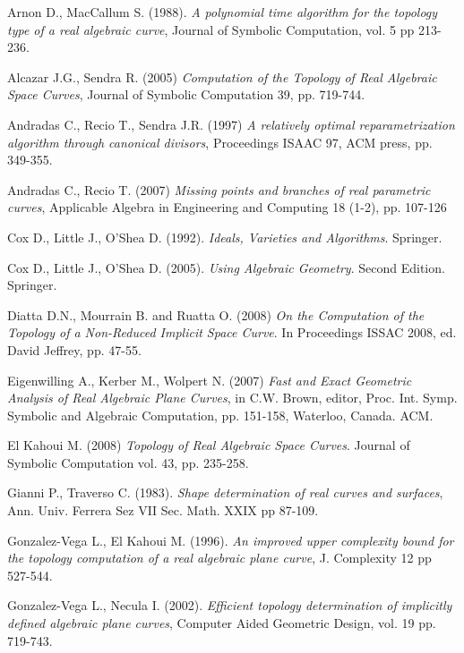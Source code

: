 \documentclass{elsart}
\begin{document}
\begin{thebibliography}{56}

 Arnon
D.,  MacCallum S. (1988). {\it A polynomial time algorithm for the
topology type of a real algebraic curve}, Journal of Symbolic
Computation, vol. 5 pp 213-236.

 Alcazar J.G., Sendra R. (2005) {\it Computation of
the Topology of Real Algebraic Space Curves}, Journal of Symbolic
Computation 39, pp. 719-744.





 Andradas C., Recio T., Sendra J.R. (1997) {\it A relatively optimal
reparametrization algorithm through canonical divisors}, Proceedings ISAAC 97, ACM press, pp. 349-355.

 Andradas C., Recio T. (2007) {\it Missing points and branches of real parametric curves}, Applicable Algebra in Engineering and Computing 18 (1-2), pp. 107-126



 Cox D., Little J., O'Shea D. (1992). {\it Ideals, Varieties and Algorithms}. Springer.

 Cox D., Little J., O'Shea D. (2005). {\it Using Algebraic Geometry}. Second Edition. Springer.

 Diatta D.N., Mourrain B. and Ruatta O. (2008) {\it On the Computation of the Topology of a Non-Reduced Implicit Space Curve}. In Proceedings ISSAC 2008, ed. David Jeffrey, pp. 47-55.

 Eigenwilling A., Kerber M., Wolpert N. (2007) {\it Fast and Exact Geometric Analysis of Real Algebraic Plane Curves}, in C.W. Brown, editor, Proc. Int. Symp. Symbolic and Algebraic Computation, pp. 151-158, Waterloo, Canada. ACM.

 El Kahoui M. (2008) {\it Topology of Real Algebraic Space Curves}. Journal of Symbolic
Computation vol. 43, pp. 235-258.

 Gianni P.,
Traverso C. (1983). {\it Shape determination of real curves and
surfaces}, Ann. Univ. Ferrera Sez VII Sec. Math. XXIX pp 87-109.

 Gonzalez-Vega L.,   El
Kahoui M. (1996). {\it  An improved upper complexity bound for the
topology computation of a real algebraic plane curve}, J.
Complexity 12 pp 527-544.

 Gonzalez-Vega L., Necula I. (2002).
{\it Efficient topology determination of implicitly defined
algebraic plane curves}, Computer Aided Geometric Design, vol. 19
pp. 719-743.


\end{thebibliography}
\end{document}
